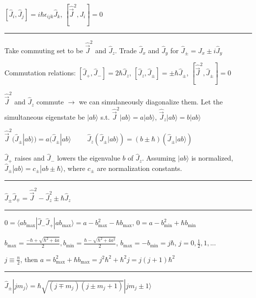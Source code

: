 $[\widehat{J}_i, \widehat{J}_j] = i \hbar \epsilon_{ijk} \widehat{J}_k$, $[\widehat{\vec{J}}^2, J_i] = 0$

\hrule height 0.1pt

Take commuting set to be $\widehat{\vec{J}}^2$ and $\widehat{J}_z$. Trade $\widehat{J}_x$ and $\widehat{J}_y$ for $\widehat{J}_{\pm} = \widehat{J}_x \pm i \widehat{J}_y$

Commutation relations: $[\widehat{J}_{+}, \widehat{J}_{-}] = 2 \hbar \widehat{J}_z$, $[\widehat{J}_z, \widehat{J}_{\pm}] = \pm \hbar \widehat{J}_{\pm}$, $[\widehat{\vec{J}}^2, \widehat{J}_{\pm}] = 0$

$\widehat{\vec{J}}^2$ and $\widehat{J}_z$ commute $\rightarrow$ we can simulaneously diagonalize them. Let the simultaneous eigenstate be $|ab\rangle$ s.t. $\widehat{\vec{J}}^2 | ab \rangle  = a | ab \rangle$, $\widehat{\vec{J}}_z | ab \rangle = b | ab \rangle$

$\widehat{\vec{J}}^2 ( \widehat{J}_{\pm} | ab \rangle) = a(\widehat{J}_{\pm} | ab \rangle \qquad$
$\widehat{J}_z(\widehat{J}_\pm |ab\rangle) = (b \pm \hbar) (\widehat{J}_{\pm} | ab \rangle)$

$\widehat{J}_{+}$ raises and $\widehat{J}_{-}$ lowers the eigenvalue $b$ of $\widehat{J}_z$. Assuming $|ab \rangle$ is normalized, $\widehat{J}_{\pm} | ab \rangle = c_{\pm} | ab \pm \hbar \rangle$, where $c_{\pm}$ are normalization constants.

\hrule height 0.05pt

$\widehat{J}_{\pm} \widehat{J}_{\mp} = \widehat{\vec{J}}^2 - \widehat{J}_z^2 \pm \hbar \widehat{J}_z$

\hrule height 0.05pt

$0 = \langle ab_{\textrm{max}} | \widehat{J}_{-} \widehat{J}_{+} | ab_{\textrm{max}} \rangle = a - b^2_{\textrm{max}} - \hbar b_{\textrm{max}}$, $0 = a - b^2_{\textrm{min}} + \hbar b_{\textrm{min}}$

\tiny
$b_{\textrm{max}} = \frac{-\hbar + \sqrt{\hbar^2 + 4a}}{2}, b_{\textrm{min}} = \frac{\hbar - \sqrt{\hbar^2 + 4a^2}}{2}$,
$b_{\textrm{max}} = -b_{\textrm{min}} = j \hbar$, $j=0, \frac{1}{2}, 1, ...$
\scriptsize

$j \equiv \frac{n}{2}$, then $a = b_{\textrm{max}}^2 + \hbar b_{\textrm{max}} = j^2 \hbar^2 + \hbar^2 j = j(j+1) \hbar^2$

\hrule height 0.05pt

$\widehat{J}_{\pm} | j m_j \rangle = \hbar \sqrt{(j \mp m_j)(j \pm m_j + 1)} | j m_j \pm 1 \rangle$

